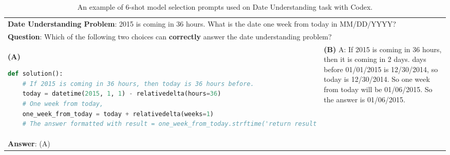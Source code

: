 \documentclass[11pt]{article}
\begin{document}
\begin{table*}[h]
    \centering
    \begin{tabular}{p{}|p{}}
    \toprule
     \multicolumn{2}{p{0.92\textwidth}}{\small \textbf{Date Understanding Problem}: 2015 is coming in 36 hours. What is the date one week from today in MM/DD/YYYY?} \\
      \multicolumn{2}{p{0.92\textwidth}}{\small \textbf{Question}: Which of the following two choices can \textbf{correctly} answer the date understanding problem?} \\
     
    \midrule

    \small \textbf{(A)}
    \lstset{style=mystyle}
     \begin{lstlisting}[language=Python]
def solution():
    # If 2015 is coming in 36 hours, then today is 36 hours before.
    today = datetime(2015, 1, 1) - relativedelta(hours=36)
    # One week from today,
    one_week_from_today = today + relativedelta(weeks=1)
    # The answer formatted with result = one_week_from_today.strftime('return result
     \end{lstlisting} 
&
    \small \textbf{(B)} \newline
    \newline
    \small A: \newline
     \small  If 2015 is coming in 36 hours, then it is coming in 2 days. \newline
     2 days before 01/01/2015 is 12/30/2014, so today is 12/30/2014. \newline
     So one week from today will be 01/06/2015.\newline
     So the answer is 01/06/2015. \\
     \midrule

      \multicolumn{2}{p{0.92\textwidth}}{\small \textbf{Answer}: (A)}
     
\\
     \bottomrule
    \end{tabular}
    \caption{An example of 6-shot model selection prompts used on Date Understanding task with Codex.}

    \label{tab:codex_example_date}
\end{table*}
\end{document}
